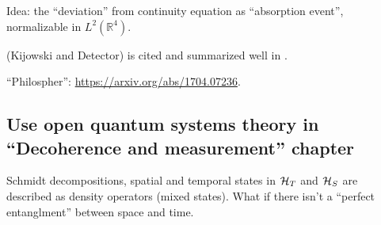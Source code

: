Idea: the ``deviation'' from continuity equation as ``absorption event'',
normalizable in $L^2(\mathbb{R}^4)$.

\cite{TQM2} (Kijowski and Detector) is cited and summarized well in
\cite{Halliwell_Detector}.

``Philospher'': \url{https://arxiv.org/abs/1704.07236}.

\subsection{Use open quantum systems theory in ``Decoherence and measurement'' chapter}
Schmidt decompositions, spatial and temporal states in
$\mathcal{H}_T$ and $\mathcal{H}_S$
are described as density operators
(mixed states). What if there isn't a ``perfect entanglment'' between space and time.
